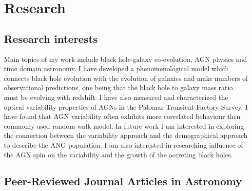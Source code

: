 \documentclass[11pt,letterpaper]{article}
\begin{document}
\section*{Research}
\subsection*{Research interests}
 Main topics of my work include black hole-galaxy co-evolution, AGN physics and time domain astronomy. I have developed a phenomenological model which connects black hole evolution with the evolution of galaxies and make numbers of observational predictions, one being that the black hole to galaxy mass ratio must be evolving with redshift. %
 I have also measured and characterized the optical variability properties of AGNs in the Palomar Transient Factory Survey. I have found that AGN variability often exhibits more correlated behaviour then commonly used random-walk model. %
 In future work I am interested in exploring the connection between the variability approach and the demographical approach to describe the ANG population. I am also interested in researching influence of the AGN spin on the variability and the growth of the accreting black holes.

\subsection*{Peer-Reviewed Journal Articles in Astronomy}
\end{document}
